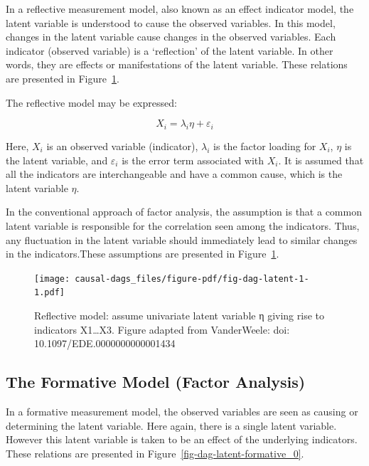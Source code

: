 \documentclass[
  singlecolumn]{report}
\begin{document}
In a reflective measurement model, also known as an effect indicator
model, the latent variable is understood to cause the observed
variables. In this model, changes in the latent variable cause changes
in the observed variables. Each indicator (observed variable) is a
`reflection' of the latent variable. In other words, they are effects or
manifestations of the latent variable. These relations are presented in
Figure~\ref{fig-dag-latent-1}.

The reflective model may be expressed:

\[X_i = \lambda_i \eta + \varepsilon_i\]

Here, \(X_i\) is an observed variable (indicator), \(\lambda_i\) is the
factor loading for \(X_i\), \(\eta\) is the latent variable, and
\(\varepsilon_i\) is the error term associated with \(X_i\). It is
assumed that all the indicators are interchangeable and have a common
cause, which is the latent variable \(\eta\).

In the conventional approach of factor analysis, the assumption is that
a common latent variable is responsible for the correlation seen among
the indicators. Thus, any fluctuation in the latent variable should
immediately lead to similar changes in the indicators.These assumptions
are presented in Figure~\ref{fig-dag-latent-1}.

\begin{figure}

{\centering \texttt{[image: causal-dags\_files/figure-pdf/fig-dag-latent-1-1.pdf]}

}

\caption{\label{fig-dag-latent-1}Reflective model: assume univariate
latent variable η giving rise to indicators X1\ldots X3. Figure adapted
from VanderWeele: doi: 10.1097/EDE.0000000000001434}

\end{figure}

\hypertarget{the-formative-model-factor-analysis}{%
\subsection{The Formative Model (Factor
Analysis)}\label{the-formative-model-factor-analysis}}

In a formative measurement model, the observed variables are seen as
causing or determining the latent variable. Here again, there is a
single latent variable. However this latent variable is taken to be an
effect of the underlying indicators. These relations are presented in
Figure~\ref{fig-dag-latent-formative_0}.
\end{document}
